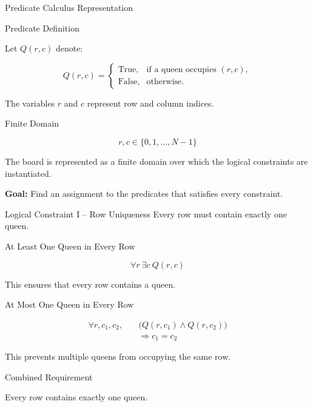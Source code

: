 \documentclass[aspectratio=169,12pt]{beamer}
\begin{document}

\begin{frame}{Predicate Calculus Representation}
\vspace{-0.3cm}
\begin{block}{Predicate Definition}

Let $Q(r,c)$ denote:

\[
Q(r,c) =
\begin{cases}
\text{True}, & \text{if a queen occupies }(r,c),\\
\text{False}, & \text{otherwise}.
\end{cases}
\]

The variables $r$ and $c$ represent row and column indices.
\end{block}

\begin{exampleblock}{Finite Domain}

\[
r,c \in \{0,1,\ldots,N-1\}
\]

The board is represented as a finite domain over which
the logical constraints are instantiated.
\end{exampleblock}

\textbf{Goal:} Find an assignment to the predicates that
satisfies every constraint.

\end{frame}


\begin{frame}{Logical Constraint I -- Row Uniqueness}
\vspace{-0.3cm}
Every row must contain exactly one queen.

\begin{block}{At Least One Queen in Every Row}

\[
\forall r\ \exists c\ Q(r,c)
\]

This ensures that every row contains a queen.
\end{block}

\begin{block}{At Most One Queen in Every Row}

\[
\begin{aligned}
\forall r,c_1,c_2,\quad
&\big(Q(r,c_1)\land Q(r,c_2)\big)\\
&\Rightarrow c_1=c_2
\end{aligned}
\]

This prevents multiple queens from occupying the same row.
\end{block}

\begin{exampleblock}{Combined Requirement}

Every row contains exactly one queen.
\end{exampleblock}

\end{frame}
\end{document}

